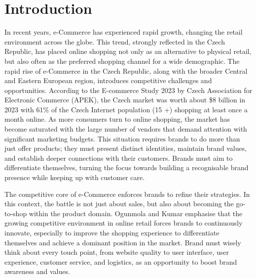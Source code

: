 \chapter*{Introduction}
\label{chap:introduction}
In recent years, e-Commerce has experienced rapid growth, changing the retail environment across the globe.
This trend, strongly reflected in the Czech Republic, has placed online shopping not only as an alternative to physical retail, but also often as the preferred shopping channel for a wide demographic.
The rapid rise of e-Commerce in the Czech Republic, along with the broader Central and Eastern European region, introduces competitive challenges and opportunities.
According to the \cite{ApekEcommerceStudy2023} E-commerce Study 2023 by Czech Association for Electronic Commerce (\ac{APEK}), the Czech market was worth about \$8 billion in 2023 with 61\% of the Czech Internet population (15 +) shopping at least once a month online.
As more consumers turn to online shopping, the market has become saturated with the large number of vendors that demand attention with significant marketing budgets.
This situation requires brands to do more than just offer products; they must present distinct identities, maintain brand values, and establish deeper connections with their customers.
Brands must aim to differentiate themselves, turning the focus towards building a recognisable brand presence while keeping up with customer care. 

The competitive core of e-Commerce enforces brands to refine their strategies. In this context, the battle is not just about sales, but also about becoming the go-to-shop within the product domain. 
Ogunmola and Kumar \cite{ecommerce-research-models} emphasise that the growing competitive environment in online retail forces brands to continuously innovate, especially to improve the shopping experience to differentiate themselves and achieve a dominant position in the market.
Brand must wisely think about every touch point, from website quality to user interface, user experience, customer service, and logistics, as an opportunity to boost brand awareness and values.

